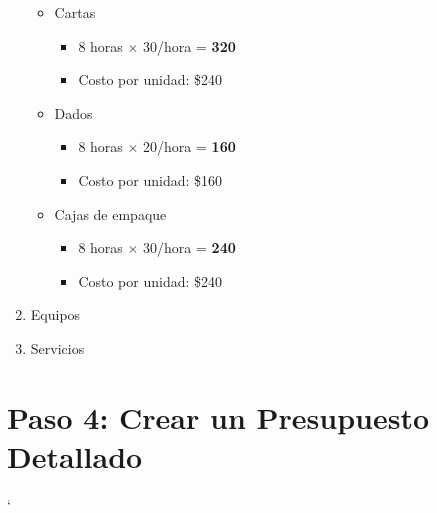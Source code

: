 \documentclass[12pt]{article}
\begin{document}
\begin{enumerate}
\begin{itemize}
		\item Cartas
        \begin{itemize}
            \item 8 horas $\times$ 30/hora = \textbf{320}
            \item Costo por unidad: \$240
        \end{itemize}


		\item Dados
        \begin{itemize}
            \item 8 horas $\times$ 20/hora = \textbf{160}
            \item Costo por unidad: \$160
        \end{itemize}



		\item Cajas de empaque
        \begin{itemize}
            \item 8 horas $\times$ 30/hora = \textbf{240}
            \item Costo por unidad: \$240
        \end{itemize}


	\end{itemize}

	\item Equipos

	

	\item Servicios

	





\end{enumerate}
    


 \section*{Paso 4: Crear un Presupuesto Detallado}
    

`
\end{document}

